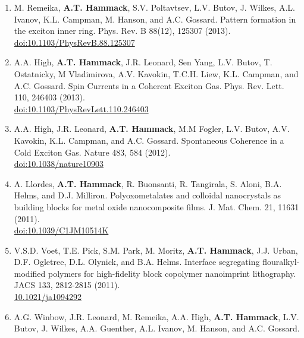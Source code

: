 {\begin{enumerate}[resume]
{        Plasmonic near-field transducer for heat-assisted magnetic recording.
        Nanophotonics 3(3), 141-155 (2014).
        \\ \href{https://doi.org/10.1515/nanoph-2014-0001}{doi:10.1515/nanoph-2014-0001}
        }
        \item {
        M. Remeika, \textbf{A.T. Hammack}, S.V. Poltavtsev, L.V. Butov, J. Wilkes, A.L. Ivanov, K.L. Campman, M. Hanson, and A.C. Gossard.
        Pattern formation in the exciton inner ring.
        Phys. Rev. B 88(12), 125307 (2013).
        \\ \href{https://doi.org/10.1103/PhysRevB.88.125307}{doi:10.1103/PhysRevB.88.125307}
        }
        \item {
        A.A. High, \textbf{A.T. Hammack}, J.R. Leonard, Sen Yang, L.V. Butov, T. Ostatnicky, M Vladimirova, A.V. Kavokin, T.C.H. Liew, K.L. Campman, and A.C. Gossard.
        Spin Currents in a Coherent Exciton Gas.
        Phys. Rev. Lett. 110, 246403 (2013).
        \\ \href{https://doi.org/10.1103/PhysRevLett.110.246403}{doi:10.1103/PhysRevLett.110.246403}
        }
        \item {
        A.A. High, J.R. Leonard, \textbf{A.T. Hammack}, M.M Fogler, L.V. Butov, A.V. Kavokin, K.L. Campman, and A.C. Gossard.
        Spontaneous Coherence in a Cold Exciton Gas.
        Nature 483, 584 (2012).
        \\ \href{https://doi.org/10.1038/nature10903}{doi:10.1038/nature10903}
        }
        \item {
        A. Llordes, \textbf{A.T. Hammack}, R. Buonsanti, R. Tangirala, S. Aloni, B.A. Helms, and D.J. Milliron.
        Polyoxometalates and colloidal nanocrystals as building blocks for metal oxide nanocomposite ﬁlms.
        J. Mat. Chem. 21, 11631 (2011).
        \\ \href{https://doi.org/10.1038/nature10903}{doi:10.1039/C1JM10514K}
        }
        \item {
        V.S.D. Voet, T.E. Pick, S.M. Park, M. Moritz, \textbf{A.T. Hammack}, J.J. Urban, D.F. Ogletree, D.L. Olynick, and B.A. Helms.
        Interface segregating ﬂouralkyl-modiﬁed polymers for high-ﬁdelity block copolymer nanoimprint lithography.
        JACS 133, 2812-2815 (2011).
        \\ \href{https://doi.org/10.1021/ja1094292}{10.1021/ja1094292}
        }
        \item {
        A.G. Winbow, J.R. Leonard, M. Remeika, A.A. High, \textbf{A.T. Hammack}, L.V. Butov, J. Wilkes, A.A. Guenther, A.L. Ivanov, M. Hanson, and A.C. Gossard.
}
\end{enumerate}}

